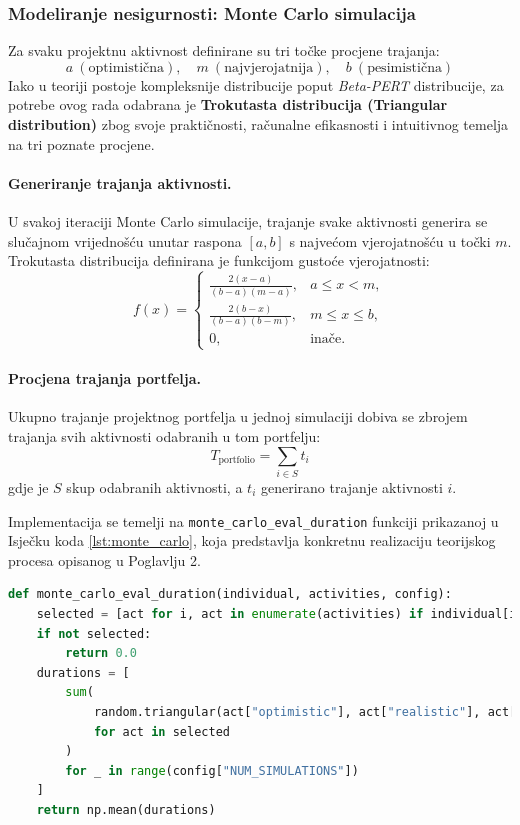 \subsubsection{Modeliranje nesigurnosti: Monte Carlo simulacija}

Za svaku projektnu aktivnost definirane su tri točke procjene trajanja:
\[
a \ (\text{optimistična}), \quad
m \ (\text{najvjerojatnija}), \quad
b \ (\text{pesimistična})
\]
Iako u teoriji postoje kompleksnije distribucije poput \textit{Beta-PERT} distribucije, 
za potrebe ovog rada odabrana je \textbf{Trokutasta distribucija (Triangular distribution)} 
zbog svoje praktičnosti, računalne efikasnosti i intuitivnog temelja na tri poznate procjene.

\paragraph{Generiranje trajanja aktivnosti.}
U svakoj iteraciji Monte Carlo simulacije, trajanje svake aktivnosti generira se slučajnom vrijednošću 
unutar raspona $[a, b]$ s najvećom vjerojatnošću u točki $m$.  
Trokutasta distribucija definirana je funkcijom gustoće vjerojatnosti:
\[
f(x) =
\begin{cases}
\frac{2(x-a)}{(b-a)(m-a)}, & a \leq x < m, \\
\frac{2(b-x)}{(b-a)(b-m)}, & m \leq x \leq b, \\
0, & \text{inače}.
\end{cases}
\]

\paragraph{Procjena trajanja portfelja.}
Ukupno trajanje projektnog portfelja u jednoj simulaciji dobiva se zbrojem trajanja svih aktivnosti odabranih u tom portfelju:
\[
T_{\text{portfolio}} = \sum_{i \in S} t_i
\]
gdje je $S$ skup odabranih aktivnosti, a $t_i$ generirano trajanje aktivnosti $i$.

Implementacija se temelji na \texttt{monte\_carlo\_eval\_duration} funkciji prikazanoj u Isječku koda \ref{lst:monte_carlo}, koja predstavlja konkretnu realizaciju teorijskog procesa opisanog u Poglavlju 2. 
\begin{lstlisting}[language=Python, caption={Funkcija za Monte Carlo procjenu trajanja}, label={lst:monte_carlo}, captionpos=b]
def monte_carlo_eval_duration(individual, activities, config):
    selected = [act for i, act in enumerate(activities) if individual[i] == 1]
    if not selected:
        return 0.0
    durations = [
        sum(
            random.triangular(act["optimistic"], act["realistic"], act["pessimistic"])
            for act in selected
        )
        for _ in range(config["NUM_SIMULATIONS"])
    ]
    return np.mean(durations)
\end{lstlisting}


